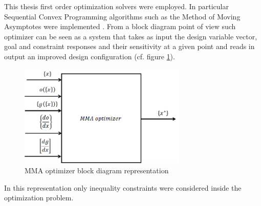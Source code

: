 This thesis first order optimization solvers were employed. In particular Sequential Convex Programming algorithms such as the Method of Moving Asymptotes were implemented \cite{svanberg1987method,svanberg2002class}. From a block diagram point of view such optimizer can be seen as a system that takes as input the design variable vector, goal and constraint responses and their sensitivity at a given point and reads in output an improved design configuration (cf. figure \ref{fig.2.5}).
\begin{figure}[ht]
\centering
\includegraphics[width=8cm]{images/Ch2/Optimizer_block}
\caption{MMA optimizer block diagram representation}
\label{fig.2.5}
\end{figure}
In this representation only inequality constraints were considered inside the optimization problem. 
